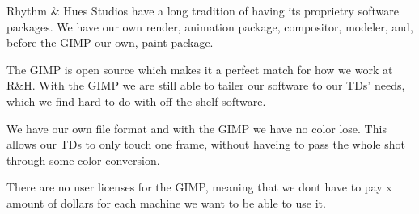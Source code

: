 Rhythm \& Hues Studios have a long tradition of having its proprietry 
software packages. We have our own render, animation package,
compositor, modeler, and, before the GIMP our own, paint package. 

The GIMP is open source which makes it a perfect match for how we work at
R\&H. With the GIMP we are still able to tailer our software to our
TDs' needs, which we find hard to do with off the shelf software.  

We have our own file format and with the GIMP we have no color lose.
This allows our TDs to only touch one frame, without haveing to pass
the whole shot through some color conversion.

There are no user licenses for the GIMP, meaning that we dont have to
pay x amount of dollars for each machine we want to be able to use it.

 
